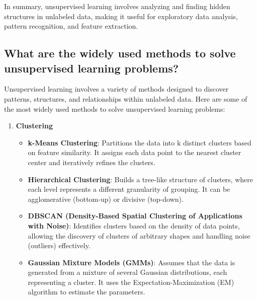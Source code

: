 In summary, unsupervised learning involves analyzing and finding hidden structures in unlabeled data, making it useful for exploratory data analysis, pattern recognition, and feature extraction.

\subsection{What are the widely used methods to solve unsupervised learning problems?}
Unsupervised learning involves a variety of methods designed to discover patterns, structures, and relationships within unlabeled data. Here are some of the most widely used methods to solve unsupervised learning problems:

\begin{enumerate}
    \item \textbf{Clustering}
    \begin{itemize}
        \item \textbf{k-Means Clustering}: Partitions the data into k distinct clusters based on feature similarity. It assigns each data point to the nearest cluster center and iteratively refines the clusters.
        \item \textbf{Hierarchical Clustering}: Builds a tree-like structure of clusters, where each level represents a different granularity of grouping. It can be agglomerative (bottom-up) or divisive (top-down).
        \item \textbf{DBSCAN (Density-Based Spatial Clustering of Applications with Noise)}: Identifies clusters based on the density of data points, allowing the discovery of clusters of arbitrary shapes and handling noise (outliers) effectively.
        \item \textbf{Gaussian Mixture Models (GMMs)}: Assumes that the data is generated from a mixture of several Gaussian distributions, each representing a cluster. It uses the Expectation-Maximization (EM) algorithm to estimate the parameters.
    \end{itemize}


\end{enumerate}
